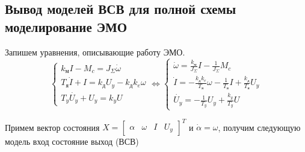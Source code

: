 \documentclass[a4paper, 12pt]{article}
\begin{document}
\newpage

\begin{center}
	\section{Вывод моделей ВСВ для полной схемы моделирование ЭМО}
\end{center} \par

Запишем уравнения, описывающие работу ЭМО. 
\begin{equation}
\begin{cases}
k_\text{м}I - M_c = J_\Sigma \dot{\omega} \\
T_\text{я}\dot{I} + I = k_\text{д}U_y - k_\text{д}k_e\omega \\
T_y\dot{U_y} + U_y = k_yU
\end{cases} \Leftrightarrow
\begin{cases}
\dot{\omega} = \frac{k_\text{м}}{J_\Sigma}I - \frac{1}{J_\Sigma}M_c \\
\dot{I} = - \frac{k_\text{д}k_e}{T_\text{я}}\omega - \frac{1}{T_\text{я}}I + \frac{k_\text{д}}{T_\text{я}}U_y \\
\dot{U_y} = -\frac{1}{T_y}U_y + \frac{k_y}{T_y}U
\end{cases}
\end{equation} \par
Примем вектор состояния $X = \begin{bmatrix} \alpha & \omega & I & U_y \end{bmatrix}^T$ и $\dot{\alpha} = \omega$, получим следующую модель вход состояние выход (ВСВ)
\end{document}

